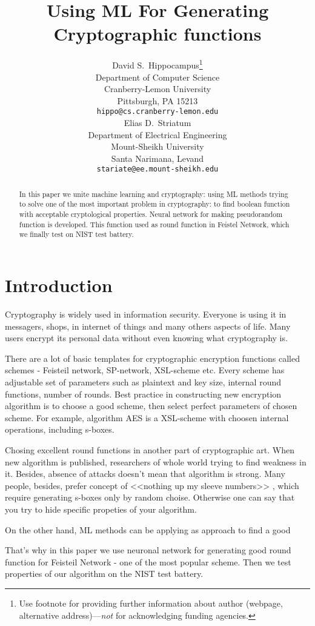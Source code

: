 \documentclass{article}
\title{Using ML For Generating Cryptographic functions}
\author{
  David S.~Hippocampus\thanks{Use footnote for providing further
    information about author (webpage, alternative
    address)---\emph{not} for acknowledging funding agencies.} \\
  Department of Computer Science\\
  Cranberry-Lemon University\\
  Pittsburgh, PA 15213 \\
  \texttt{hippo@cs.cranberry-lemon.edu} \\
   \And
 Elias D.~Striatum \\
  Department of Electrical Engineering\\
  Mount-Sheikh University\\
  Santa Narimana, Levand \\
  \texttt{stariate@ee.mount-sheikh.edu} \\
}
\begin{document}
\maketitle

\begin{abstract}
In this paper we unite machine learning 
and cryptography: using ML methods 
trying to solve one of the 
most important problem
in cryptography: to find boolean
function with acceptable cryptological
properties. Neural network for making pseudorandom
function is developed. This function 
used as round function in Feistel Network, which 
 we finally test on NIST test battery.
\end{abstract}




\section{Introduction}

Cryptography is widely used in
information security. 
Everyone is using it in messagers, shops, 
in internet of things and many others 
aspects of life. Many users
encrypt its personal data without even 
knowing what cryptography is. 

There are a lot of basic templates
for cryptographic encryption
functions called schemes - Feisteil network, SP-network, XSL-scheme etc. 
Every scheme has adjustable
set of parameters such as 
plaintext and key size, internal
round functions, number of rounds. 
Best practice in constructing new encryption
algorithm is to choose a good scheme, 
then select perfect parameters of chosen scheme.
For example, algorithm AES is a XSL-scheme 
with choosen internal operations, including s-boxes.

Chosing excellent round functions in another part 
of cryptographic art.
When new algorithm is published,
researchers of whole world trying to find 
 weakness in it.
 Besides, absence of attacks 
 doesn't mean that algorithm is strong. 
 Many people, besides,  prefer  concept of 
 <<nothing up my sleeve numbers>> \cite{NMSN}, 
 which require generating s-boxes only 
 by random choise. Otherwise one can say that you
 try to hide specific propeties of your algorithm.
 
 
 On the other hand, ML methods can be applying as
 approach to find a good 
 
 That's why in this paper we use neuronal network for generating good round function 
 for Feisteil Network - one of the most popular scheme.
 Then we test properties of our algorithm on the NIST test battery.
\end{document}

